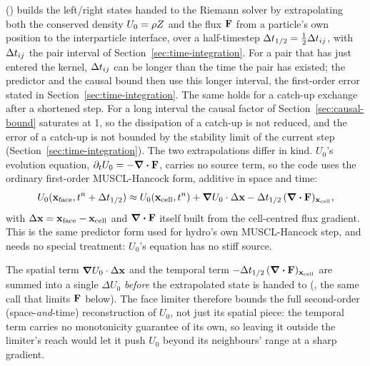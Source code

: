  ()
builds the left/right states handed to the Riemann solver by
extrapolating both the conserved density $U_0=\rho Z$ and the flux
$\mathbf{F}$ from a particle's own position to the interparticle interface,
over a half-timestep $\Delta t_{1/2}=\tfrac12\Delta t_{ij}$, with $\Delta t_{ij}$ the pair
interval of Section~\ref{sec:time-integration}. For a pair that has just
entered the kernel, $\Delta t_{ij}$ can be longer than the time the pair has
existed; the predictor and the causal bound then use this longer
interval, the first-order error stated in
Section~\ref{sec:time-integration}. The same holds for a catch-up exchange
after a shortened step. For a long interval the causal factor of
Section~\ref{sec:causal-bound} saturates at 1, so the dissipation of a
catch-up is not reduced, and the error of a catch-up is not bounded by the
stability limit of the current step (Section~\ref{sec:time-integration}).
The two extrapolations
differ in kind. $U_0$'s evolution equation, $\partial_tU_0=-\div\mathbf{F}$,
carries no source term, so the code uses the ordinary first-order
MUSCL-Hancock form, additive in space and time:
\begin{equation}
  U_0(\mathbf x_{\rm face},t^n+\Delta t_{1/2}) \approx
  U_0(\mathbf x_{\rm cell},t^n) + \grad U_0\cdot\Delta\mathbf x
  - \Delta t_{1/2}\,(\div\mathbf{F})_{\mathbf x_{\rm cell}} ,
\end{equation}
with $\Delta\mathbf x=\mathbf x_{\rm face}-\mathbf x_{\rm cell}$ and
$\div\mathbf{F}$ itself built from the cell-centred flux gradient. This is
the same predictor form used for hydro's own MUSCL-Hancock step, and
needs no special treatment: $U_0$'s equation has no stiff source.

The spatial term $\grad U_0\cdot\Delta\mathbf x$ and the temporal term
$-\Delta t_{1/2}\,(\div\mathbf{F})_{\mathbf x_{\rm cell}}$ are summed into a single
$\Delta U_0$ \emph{before} the extrapolated state is handed to
 (,
the same call that limits $\mathbf{F}$ below). The face limiter
therefore bounds the full second-order (space-\emph{and}-time)
reconstruction of $U_0$, not just its spatial piece: the temporal term
carries no monotonicity guarantee of its own, so leaving it outside the
limiter's reach would let it push $U_0$ beyond its neighbours' range at a
sharp gradient.

